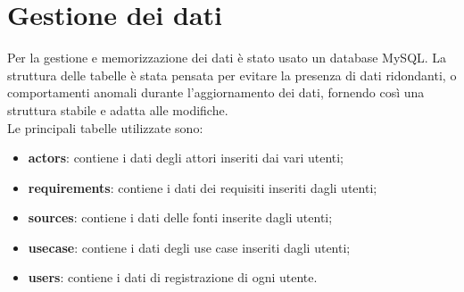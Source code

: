 \section{Gestione dei dati}
Per la gestione e memorizzazione dei dati è stato usato un database MySQL. La struttura delle tabelle è stata pensata per evitare la presenza di dati ridondanti, o comportamenti anomali durante l’aggiornamento dei dati, fornendo così una struttura stabile e adatta alle modifiche. \\
Le principali tabelle utilizzate sono:
\begin{itemize}
	\item \textbf{actors}: contiene i dati degli attori inseriti dai vari utenti;
	\item \textbf{requirements}: contiene i dati dei requisiti inseriti dagli utenti;
	\item \textbf{sources}: contiene i dati delle fonti inserite dagli utenti;
	\item \textbf{usecase}: contiene i dati degli use case inseriti dagli utenti;
	\item \textbf{users}: contiene i dati di registrazione di ogni utente.
\end{itemize}  